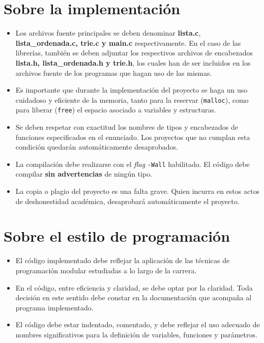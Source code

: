 \documentclass[12pt,a4paper]{article}
\begin{document}
\section*{Sobre la implementación}
\begin{itemize}
	\item Los archivos fuente principales se deben denominar \textbf{\textsf{lista.c}}, \textbf{\textsf{lista\_ordenada.c}, \textsf{trie.c} y \textsf{main.c}} respectivamente. En el caso de las librerías, también se deben adjuntar los respectivos archivos de encabezados \textbf{\textsf{lista.h}, \textbf{\textsf{lista\_ordenada.h}} y \textsf{trie.h}}, los cuales han de	ser incluidos en los archivos fuente de los programas que hagan uso de las mismas.
	
	\item Es importante que durante la implementación del proyecto se haga un uso
	cuidadoso y eficiente de la memoria, tanto para la reservar
	(\texttt{malloc}), como para liberar (\texttt{free}) el espacio asociado a
	variables y estructuras.
	
	\item Se deben respetar con exactitud los nombres de tipos y encabezados de
	funciones especificados en el enunciado. Los proyectos que no cumplan esta condición quedarán automáticamente desaprobados.
	
	\item La compilación debe realizarse con el \emph{flag} \texttt{-Wall} habilitado. El código debe compilar \textbf{sin advertencias} de ningún tipo.
	
	\item La copia o plagio del proyecto es una falta grave. Quien incurra en estos actos de deshonestidad académica, desaprobará automáticamente el proyecto.
\end{itemize}

\section*{Sobre el estilo de programación}
\begin{itemize}
		
	\item El código implementado debe reflejar la aplicación de las técnicas de programación modular estudiadas a lo largo de la carrera.
	
	\item En el código, entre eficiencia y claridad, se debe optar por la claridad. Toda decisión en este sentido debe constar en la documentación que acompaña al programa implementado.
	
	\item El código debe estar indentado, comentado, y debe reflejar el uso adecuado de nombres significativos para la definición de variables, funciones y parámetros.
	
\end{itemize}
\end{document}
